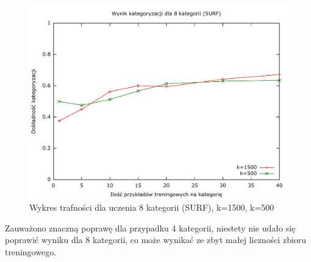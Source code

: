\begin{figure}[h]
	\centering
	\includegraphics[scale=0.8]{graphics/04_interpretacja_wynikow/result-surf-8-1500-500.pdf}
	\caption{ Wykres trafności dla uczenia 8 kategorii (SURF), k=1500, k=500 }
	\label{fig:result-surf-8-1500-500}
\end{figure}

Zauważono znaczną poprawę dla przypadku 4 kategorii, niestety nie udało się poprawić wyniku dla 8 kategorii, co może wynikać ze zbyt małej liczności zbioru treningowego.